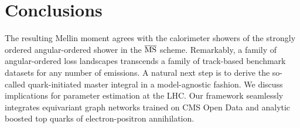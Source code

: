 \section{Conclusions}\label{sec:conclusions}

The resulting Mellin moment agrees with the calorimeter showers of the
strongly ordered angular-ordered shower in the $\overline{\rm MS}$
scheme. Remarkably, a family of angular-ordered loss landscapes
transcends a family of track-based benchmark datasets for any number of
emissions. A natural next step is to derive the so-called
quark-initiated master integral in a model-agnostic fashion. We discuss
implications for parameter estimation at the LHC. Our framework
seamlessly integrates equivariant graph networks trained on CMS Open
Data and analytic boosted top quarks of electron-positron annihilation.

